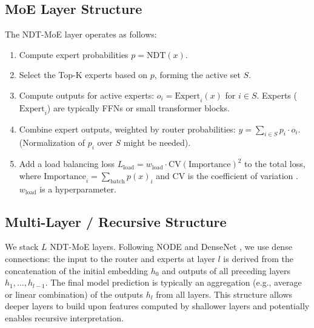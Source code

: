 \documentclass[11pt,a4paper]{article}
\begin{document}
\subsection{MoE Layer Structure}
The NDT-MoE layer operates as follows:
\begin{enumerate}
    \item Compute expert probabilities $p = \text{NDT}(x)$.
    \item Select the Top-K experts based on $p$, forming the active set $S$.
    \item Compute outputs for active experts: $o_i = \text{Expert}_i(x)$ for $i \in S$. Experts ($\text{Expert}_i$) are typically FFNs or small transformer blocks.
    \item Combine expert outputs, weighted by router probabilities: $y = \sum_{i \in S} p_i \cdot o_i$. (Normalization of $p_i$ over $S$ might be needed).
    \item Add a load balancing loss $L_{\text{load}} = w_{\text{load}} \cdot \text{CV}(\text{Importance})^2$ to the total loss, where $\text{Importance}_i = \sum_{\text{batch}} p(x)_i$ and CV is the coefficient of variation \citep{shazeer2017outrageously}. $w_{\text{load}}$ is a hyperparameter.
\end{enumerate}

\subsection{Multi-Layer / Recursive Structure}
We stack $L$ NDT-MoE layers. Following NODE \citep{popov2019neural} and DenseNet \citep{huang2017densely}, we use dense connections: the input to the router and experts at layer $l$ is derived from the concatenation of the initial embedding $h_0$ and outputs of all preceding layers $h_1, ..., h_{l-1}$.
The final model prediction is typically an aggregation (e.g., average or linear combination) of the outputs $h_l$ from all layers. This structure allows deeper layers to build upon features computed by shallower layers and potentially enables recursive interpretation.
\end{document}

